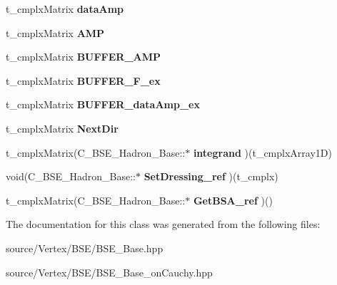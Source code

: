 \begin{DoxyCompactItemize}
\item 
\hypertarget{class_c___b_s_e___hadron___base_a2e5f7f12447d2e32b429218675f1e137}{t\-\_\-cmplx\-Matrix {\bfseries data\-Amp}}\label{class_c___b_s_e___hadron___base_a2e5f7f12447d2e32b429218675f1e137}

\item 
\hypertarget{class_c___b_s_e___hadron___base_a7dad5c73f05164a1a9c2d4971a3ac940}{t\-\_\-cmplx\-Matrix {\bfseries A\-M\-P}}\label{class_c___b_s_e___hadron___base_a7dad5c73f05164a1a9c2d4971a3ac940}

\item 
\hypertarget{class_c___b_s_e___hadron___base_aaa5cb8a9ba49ef4b4d5df171b95f888e}{t\-\_\-cmplx\-Matrix {\bfseries B\-U\-F\-F\-E\-R\-\_\-\-A\-M\-P}}\label{class_c___b_s_e___hadron___base_aaa5cb8a9ba49ef4b4d5df171b95f888e}

\item 
\hypertarget{class_c___b_s_e___hadron___base_a429b94e49eaf32267e2ab07fb9aec4aa}{t\-\_\-cmplx\-Matrix {\bfseries B\-U\-F\-F\-E\-R\-\_\-\-F\-\_\-ex}}\label{class_c___b_s_e___hadron___base_a429b94e49eaf32267e2ab07fb9aec4aa}

\item 
\hypertarget{class_c___b_s_e___hadron___base_a7cff65d9a531e41213939b0d6ff8dd05}{t\-\_\-cmplx\-Matrix {\bfseries B\-U\-F\-F\-E\-R\-\_\-data\-Amp\-\_\-ex}}\label{class_c___b_s_e___hadron___base_a7cff65d9a531e41213939b0d6ff8dd05}

\item 
\hypertarget{class_c___b_s_e___hadron___base_aa511b5aaf62e659b8b3dd08e785320f4}{t\-\_\-cmplx\-Matrix {\bfseries Next\-Dir}}\label{class_c___b_s_e___hadron___base_aa511b5aaf62e659b8b3dd08e785320f4}

\item 
\hypertarget{class_c___b_s_e___hadron___base_a0921debd25f7c6eae48f0a64f9435e73}{t\-\_\-cmplx\-Matrix(C\-\_\-\-B\-S\-E\-\_\-\-Hadron\-\_\-\-Base\-::$\ast$ {\bfseries integrand} )(t\-\_\-cmplx\-Array1\-D)}\label{class_c___b_s_e___hadron___base_a0921debd25f7c6eae48f0a64f9435e73}

\item 
\hypertarget{class_c___b_s_e___hadron___base_acf2a8a7867dc49f626a62257dc92c447}{void(C\-\_\-\-B\-S\-E\-\_\-\-Hadron\-\_\-\-Base\-::$\ast$ {\bfseries Set\-Dressing\-\_\-ref} )(t\-\_\-cmplx)}\label{class_c___b_s_e___hadron___base_acf2a8a7867dc49f626a62257dc92c447}

\item 
\hypertarget{class_c___b_s_e___hadron___base_ad9aa0689e034e7799a8589679f8eceb7}{t\-\_\-cmplx\-Matrix(C\-\_\-\-B\-S\-E\-\_\-\-Hadron\-\_\-\-Base\-::$\ast$ {\bfseries Get\-B\-S\-A\-\_\-ref} )()}\label{class_c___b_s_e___hadron___base_ad9aa0689e034e7799a8589679f8eceb7}

\end{DoxyCompactItemize}


The documentation for this class was generated from the following files\-:\begin{DoxyCompactItemize}
\item 
source/\-Vertex/\-B\-S\-E/B\-S\-E\-\_\-\-Base.\-hpp\item 
source/\-Vertex/\-B\-S\-E/B\-S\-E\-\_\-\-Base\-\_\-on\-Cauchy.\-hpp\end{DoxyCompactItemize}
